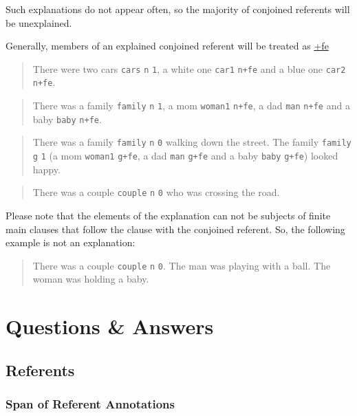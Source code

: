 \documentclass[
]{book}
\begin{document}
Such explanations do not appear often, so the majority of conjoined referents will be unexplained.

Generally, members of an explained conjoined referent will be treated as \protect\hyperlink{further-explanation}{+fe}

\begin{quote}
There were two cars \texttt{cars} \texttt{n} \texttt{1}, a white one \texttt{car1} \texttt{n+fe} and a blue one \texttt{car2} \texttt{n+fe}.
\end{quote}

\begin{quote}
There was a family \texttt{family} \texttt{n} \texttt{1}, a mom \texttt{woman1} \texttt{n+fe}, a dad \texttt{man} \texttt{n+fe} and a baby \texttt{baby} \texttt{n+fe}.
\end{quote}

\begin{quote}
There was a family \texttt{family} \texttt{n} \texttt{0} walking down the street. The family \texttt{family} \texttt{g} \texttt{1} (a mom \texttt{woman1} \texttt{g+fe}, a dad \texttt{man} \texttt{g+fe} and a baby \texttt{baby} \texttt{g+fe}) looked happy.
\end{quote}

\begin{quote}
There was a couple \texttt{couple} \texttt{n} \texttt{0} who was crossing the road.
\end{quote}

Please note that the elements of the explanation can not be subjects of finite main clauses that follow the clause with the conjoined referent. So, the following example is not an explanation:

\begin{quote}
There was a couple \texttt{couple} \texttt{n} \texttt{0}. The man was playing with a ball. The woman was holding a baby.
\end{quote}

\hypertarget{questions-answers}{%
\chapter{Questions \& Answers}\label{questions-answers}}

\hypertarget{referents-1}{%
\section{Referents}\label{referents-1}}

\hypertarget{span-of-referent-annotations}{%
\subsection{Span of Referent Annotations}\label{span-of-referent-annotations}}
\end{document}
